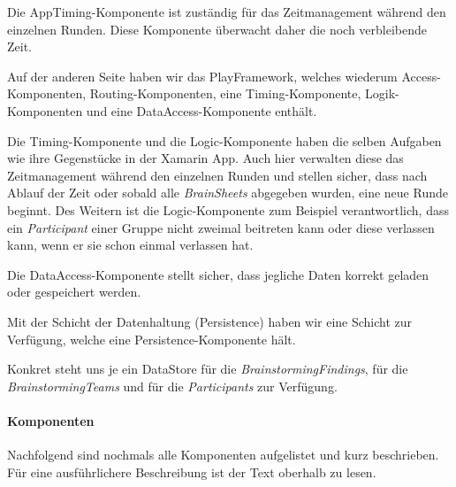 Die AppTiming-Komponente ist zuständig für das Zeitmanagement während den einzelnen Runden. Diese Komponente überwacht daher die noch verbleibende Zeit.

Auf der anderen Seite haben wir das PlayFramework, welches wiederum Access-Komponenten, Routing-Komponenten, eine Timing-Komponente, Logik-Komponenten und eine DataAccess-Komponente enthält.

Die Timing-Komponente und die Logic-Komponente haben die selben Aufgaben wie ihre Gegenstücke in der Xamarin App. Auch hier verwalten diese das Zeitmanagement während den einzelnen Runden und stellen sicher, dass nach Ablauf der Zeit oder sobald alle \textit{BrainSheets} abgegeben wurden, eine neue Runde beginnt. Des Weitern ist die Logic-Komponente zum Beispiel verantwortlich, dass ein \textit{Participant} einer Gruppe nicht zweimal beitreten kann oder diese verlassen kann, wenn er sie schon einmal verlassen hat. 

Die DataAccess-Komponente stellt sicher, dass jegliche Daten korrekt geladen oder gespeichert werden.

Mit der Schicht der Datenhaltung (Persistence) haben wir eine Schicht zur Verfügung, welche eine Persistence-Komponente hält. 

Konkret steht uns je ein DataStore für die \textit{BrainstormingFindings}, für die \textit{BrainstormingTeams} und für die \textit{Participants} zur Verfügung.


\paragraph*{Komponenten}
Nachfolgend sind nochmals alle Komponenten aufgelistet und kurz beschrieben. Für eine ausführlichere Beschreibung ist der Text oberhalb zu lesen.

